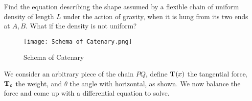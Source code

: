 \documentclass[11pt]{article}
\begin{document}
\begin{problem}[Catenary]
  Find the equation describing the shape assumed by a flexible chain of uniform density of length \(L\) under the action of gravity, when it is hung from its two ends at \(A,B\). What if the density is not uniform?
\end{problem}
\begin{figure}[ht]
  \texttt{[image: Schema of Catenary.png]}
  \caption{Schema of Catenary}
\end{figure}
\begin{solution}
  We consider an arbitrary piece of the chain \(PQ\), define \(\bf{T}(x)\) the tangential force, \(\bf{T_c}\) the weight, and \(\theta\) the angle with horizontal, as shown. We now balance the force and come up with a differential equation to solve.
  
\end{solution}




\end{document}
